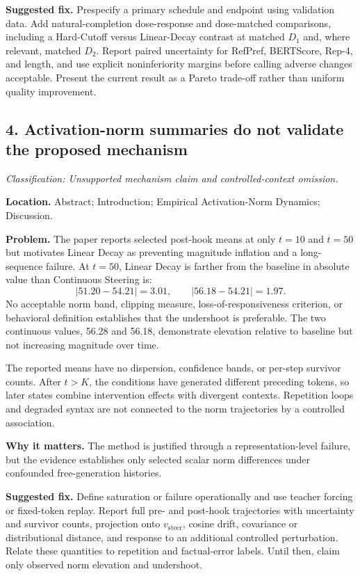 \documentclass[11pt]{article}
\newcommand{\findinglabel}[1]{\textbf{#1}}
\newcommand{\classification}[1]{\textit{Classification: #1.}}
\begin{document}
\findinglabel{Suggested fix.} Prespecify a primary schedule and endpoint using validation data.  Add natural-completion dose-response and dose-matched comparisons, including a Hard-Cutoff versus Linear-Decay contrast at matched $D_1$ and, where relevant, matched $D_2$.  Report paired uncertainty for RefPref, BERTScore, Rep-4, and length, and use explicit noninferiority margins before calling adverse changes acceptable.  Present the current result as a Pareto trade-off rather than uniform quality improvement.

\subsection*{4. Activation-norm summaries do not validate the proposed mechanism}

\classification{Unsupported mechanism claim and controlled-context omission}

\findinglabel{Location.} Abstract; Introduction; Empirical Activation-Norm Dynamics; Discussion.

\findinglabel{Problem.} The paper reports selected post-hook means at only $t=10$ and $t=50$ but motivates Linear Decay as preventing magnitude inflation and a long-sequence failure.  At $t=50$, Linear Decay is farther from the baseline in absolute value than Continuous Steering is:
\[
|51.20-54.21|=3.01,
\qquad
|56.18-54.21|=1.97.
\]
No acceptable norm band, clipping measure, loss-of-responsiveness criterion, or behavioral definition establishes that the undershoot is preferable.  The two continuous values, 56.28 and 56.18, demonstrate elevation relative to baseline but not increasing magnitude over time.

The reported means have no dispersion, confidence bands, or per-step survivor counts.  After $t>K$, the conditions have generated different preceding tokens, so later states combine intervention effects with divergent contexts.  Repetition loops and degraded syntax are not connected to the norm trajectories by a controlled association.

\findinglabel{Why it matters.} The method is justified through a representation-level failure, but the evidence establishes only selected scalar norm differences under confounded free-generation histories.

\findinglabel{Suggested fix.} Define saturation or failure operationally and use teacher forcing or fixed-token replay.  Report full pre- and post-hook trajectories with uncertainty and survivor counts, projection onto $v_{\text{steer}}$, cosine drift, covariance or distributional distance, and response to an additional controlled perturbation.  Relate these quantities to repetition and factual-error labels.  Until then, claim only observed norm elevation and undershoot.
\end{document}
